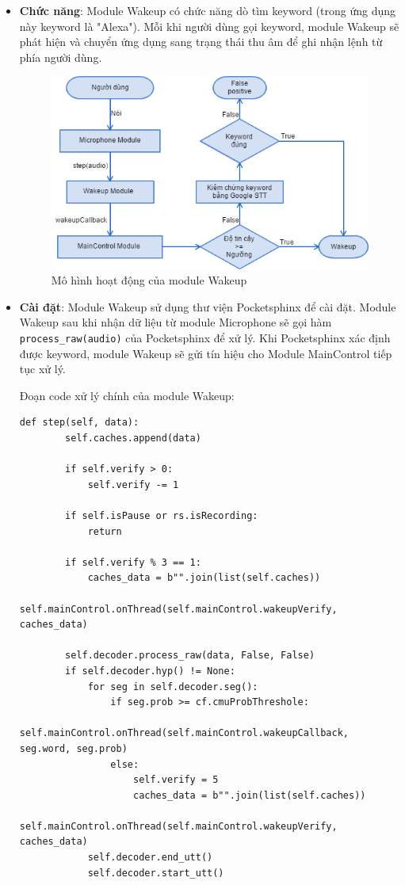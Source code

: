 \begin{itemize}
\item \textbf{Chức năng}: Module Wakeup có chức năng dò tìm keyword (trong ứng dụng này keyword là "Alexa"). Mỗi khi người dùng gọi keyword, module Wakeup sẽ phát hiện và chuyển ứng dụng sang trạng thái thu âm để ghi nhận lệnh từ phía người dùng.

\begin{figure}[h]
    \centering
    \includegraphics[scale=0.5]{wakeup_flowchart}
    \caption{Mô hình hoạt động của module Wakeup}
    \label{fig:c6_wakeup_flowchart}
\end{figure}

\item \textbf{Cài đặt}: Module Wakeup sử dụng thư viện Pocketsphinx để cài đặt. Module Wakeup sau khi nhận dữ liệu từ module Microphone sẽ gọi hàm \lstinline{process_raw(audio)} của Pocketsphinx để xử lý. Khi Pocketsphinx xác định được keyword, module Wakeup sẽ gửi tín hiệu cho Module MainControl tiếp tục xử lý.

Đoạn code xử lý chính của module Wakeup:
\begin{lstlisting}
def step(self, data):
        self.caches.append(data)

        if self.verify > 0:
            self.verify -= 1

        if self.isPause or rs.isRecording:
            return

        if self.verify % 3 == 1:
            caches_data = b"".join(list(self.caches)) 
            self.mainControl.onThread(self.mainControl.wakeupVerify, caches_data)

        self.decoder.process_raw(data, False, False)
        if self.decoder.hyp() != None:
            for seg in self.decoder.seg():
                if seg.prob >= cf.cmuProbThreshole:     
                    self.mainControl.onThread(self.mainControl.wakeupCallback, seg.word, seg.prob)
                else:
                    self.verify = 5
                    caches_data = b"".join(list(self.caches)) 
                    self.mainControl.onThread(self.mainControl.wakeupVerify, caches_data)
            self.decoder.end_utt()
            self.decoder.start_utt()
\end{lstlisting}


\end{itemize}
